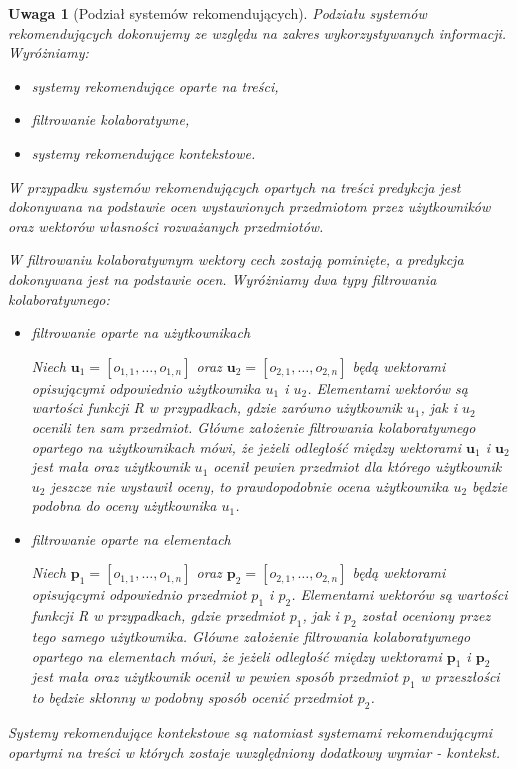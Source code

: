 \documentclass[12pt,a4paper]{report}
\newtheorem{uwaga}[df]{Uwaga}
\begin{document}
\begin{uwaga}[Podział systemów rekomendujących]
Podziału systemów rekomendujących dokonujemy ze względu na zakres wykorzystywanych informacji. Wyróżniamy:
\begin{itemize}
\item systemy rekomendujące oparte na treści,
\item filtrowanie kolaboratywne,
\item systemy rekomendujące kontekstowe.
\end{itemize}

W przypadku systemów rekomendujących opartych na treści predykcja jest dokonywana na podstawie ocen wystawionych przedmiotom przez użytkowników oraz wektorów własności rozważanych przedmiotów. 

W filtrowaniu kolaboratywnym wektory cech zostają pominięte, a predykcja dokonywana jest na podstawie ocen. Wyróżniamy dwa typy filtrowania kolaboratywnego:
\begin{itemize}
\item filtrowanie oparte na użytkownikach

Niech $\mathbf{u}_1 = [o_{1,1}, \ldots, o_{1,n}]$ oraz $\mathbf{u}_2 = [o_{2,1}, \ldots, o_{2,n}]$ będą wektorami opisującymi odpowiednio użytkownika $u_1$ i $u_2$. Elementami wektorów są wartości funkcji R w przypadkach, gdzie zarówno użytkownik $u_1$, jak i $u_2$ ocenili ten sam przedmiot. Główne założenie filtrowania kolaboratywnego opartego na użytkownikach mówi, że jeżeli odległość między wektorami $\mathbf{u}_1$ i $\mathbf{u}_2$ jest mała oraz użytkownik $u_1$ ocenił pewien przedmiot dla którego użytkownik $u_2$ jeszcze nie wystawił oceny, to prawdopodobnie ocena użytkownika $u_2$ będzie podobna do oceny użytkownika $u_1$.
\item filtrowanie oparte na elementach

Niech $\mathbf{p}_1 = [o_{1,1}, \ldots, o_{1,n}]$ oraz $\mathbf{p}_2 = [o_{2,1}, \ldots, o_{2,n}]$ będą wektorami opisującymi odpowiednio przedmiot $p_1$ i $p_2$. Elementami wektorów są wartości funkcji R w przypadkach, gdzie przedmiot $p_1$, jak i $p_2$ został oceniony przez tego samego użytkownika. Główne założenie filtrowania kolaboratywnego opartego na elementach mówi, że jeżeli odległość między wektorami $\mathbf{p}_1$ i $\mathbf{p}_2$ jest mała oraz użytkownik ocenił w pewien sposób przedmiot $p_1$ w przeszłości to będzie skłonny w podobny sposób ocenić przedmiot $p_2$.
\end{itemize}

Systemy rekomendujące kontekstowe są natomiast systemami rekomendującymi opartymi na treści w których zostaje uwzględniony dodatkowy wymiar - kontekst.
\end{uwaga}
\end{document}
